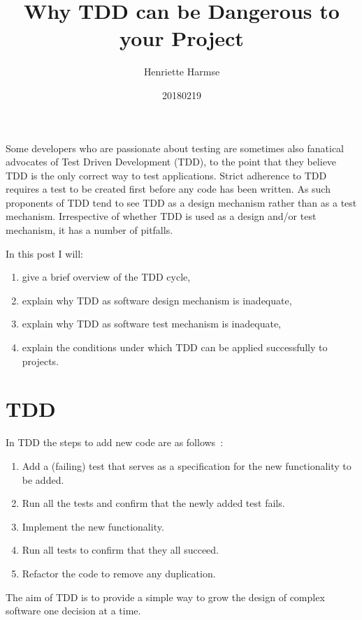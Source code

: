 \documentclass[11pt,final,onecolumn]{amsart}
\title{Why TDD can be Dangerous to your Project}
\author{Henriette Harmse}
\date{20180219}
\begin{document}
  \maketitle

  
  Some developers who are passionate about testing are sometimes also fanatical advocates of Test Driven Development (TDD), to the point that they believe TDD is the only correct way to test applications. Strict adherence to TDD requires a test to be created first before any code has been written. As such proponents of TDD tend to see TDD as a design mechanism rather than as a test mechanism. Irrespective of whether TDD is used as a design and/or test mechanism, it has a number of pitfalls.

  In this post I will:
  \begin{enumerate}
   \item give a brief overview of the TDD cycle,
   \item explain why TDD as software design mechanism is inadequate,
   \item explain why TDD as software test mechanism is inadequate,
   \item explain the conditions under which TDD can be applied successfully to projects.
  \end{enumerate}

  \section{TDD}
  In TDD the steps to add new code are as follows~\cite{Beck2003}:
  \begin{enumerate}
   \item Add a (failing) test that serves as a specification for the new functionality to be added.
   \item Run all the tests and confirm that the newly added test fails.
   \item Implement the new functionality.
   \item Run all tests to confirm that they all succeed.
   \item Refactor the code to remove any duplication.
  \end{enumerate}

  The aim of TDD is to provide a simple way to grow the design of complex software one decision at a time.
  
\end{document}
